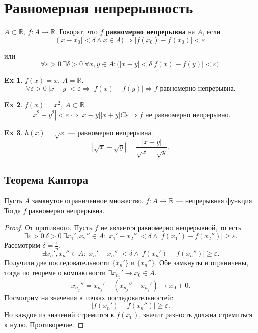 \documentclass[11pt]{book}
\newcommand{\R}{\mathbb{R}}
\renewcommand{\ge}{\geqslant}
\theoremstyle{definition}
\theoremstyle{plain}
\theoremstyle{plain}
\theoremstyle{definition}
\newtheorem*{ex}{Ex}
\theoremstyle{remark}
\begin{document}
\section{Равномерная непрерывность}
\begin{defn}
    $ A \subset \R, ~ f: A \to  \R$.
    Говорят, что $ f$  {\bf равномерно непрерывна} на $ A$, если
    $$ \bigl(|x-x_0|< \delta \wedge x \in A\bigr) \Longrightarrow |f(x_0) -f(x_0)| < \varepsilon $$

    или \[
	\forall \varepsilon >0 ~ \exists \delta  >0 ~ \forall x, y \in A: \bigl( |x-y|< \delta |f(x) -f(y)|< \varepsilon \bigr)
    .\]
\end{defn}
\begin{ex}
    $ f(x) = x, ~ A = \R$.
    \[
	\forall  \varepsilon >0 ~ |x -y| < \varepsilon  \Longrightarrow  |f(x)-f(y)| \Longrightarrow f \text{ равномерно непрерывна}
    .\]
\end{ex}
\begin{ex}
    $ f(x) = x^2, ~ A \subset \R$
    \[
	|x^2 - y^2| < \varepsilon  \Longleftrightarrow  |x-y||x+y| C \varepsilon \Longrightarrow f \text{ не равномерно непрерывно}
    .\]
\end{ex}
\begin{ex}
    $ h(x) = \sqrt {x}$ --- равномерно   непрерывна.
    \[
	\left| \sqrt{x} - \sqrt{y} \right| = \frac{|x-y|}{\sqrt{x} + \sqrt{y}}
    .\]
\end{ex}
\subsection{Теорема Кантора}
\begin{thm}[Кантор]\label{th_kantor}
    Пусть $ A$ замкнутое ограниченное множество.  $ f: A \to  \R$ --- непрерывная функция. Тогда $ f$ равномерно непрерывна.
\end{thm}
\begin{proof}
    От противного. Пусть $ f$ не является равномерно непрерывной, то есть \[
	\exists \varepsilon >0 ~ \delta >0 ~ \exists x_1', x_2'' \in A: |x_1'-x_2''| < \delta \wedge |f(x_1')-f(x_2'')| \ge \varepsilon
    .\]
    Рассмотрим $ \delta = \frac{1}{n}$.
    \[
	\exists x_{n}', x_{n}'' \in A: |x_{n}' - x_{n}''|<\delta  \wedge |f(x_{n}')-f(x_{n}'')| \ge \varepsilon
    .\]
    Получили две последовательности $ \{x_{n}'\}$ и $ \{x_{n}''\}$.
    Обе замкнуты и ограничены, тогда по теореме о компактности $ \exists x_{n_j}' \to  x_0 \in A$.
    \[
	x_{n_j}'' = x_{n_j}' + (x_{n_j}'' - x_{n_j}') \to  x_0 + 0
    .\]
    Посмотрим на значения в точках последовательностей:
    \[
	|f(x_{n}') - f(x_{n}'')| \ge \varepsilon
    .\]
    Но каждое  из значений стремится к  $ f(x_0)$, значит разность должна стремиться к нулю. Противоречие.
\end{proof}
\end{document}
